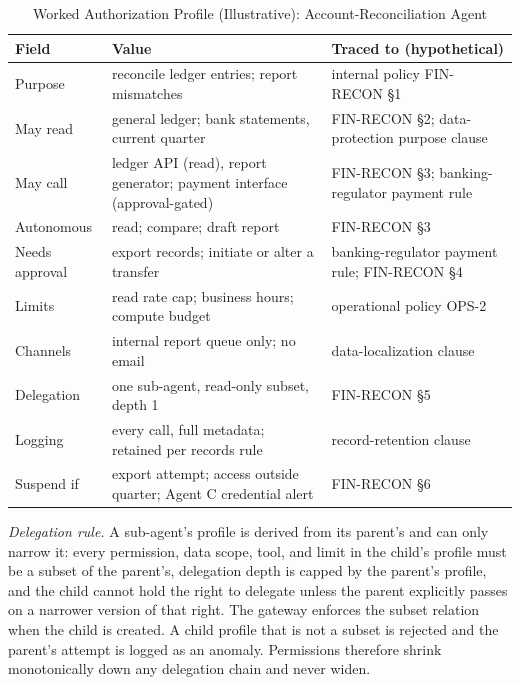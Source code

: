 \documentclass[journal]{IEEEtran}
\begin{document}
\begin{table}[!t]
\caption{Worked Authorization Profile (Illustrative): Account-Reconciliation Agent}
\label{tab:profile}
\centering
\footnotesize
\setlength{\tabcolsep}{3pt}
\begin{tabular}{>{\raggedright\arraybackslash}p{1.5cm}>{\raggedright\arraybackslash}p{3.15cm}>{\raggedright\arraybackslash}p{2.5cm}}
\toprule
\rowcolor{darkblue!15}
\textbf{Field} & \textbf{Value} & \textbf{Traced to (hypothetical)} \\
\midrule
Purpose & reconcile ledger entries; report mismatches & internal policy FIN-RECON \S1 \\
\rowcolor{darkblue!5}
May read & general ledger; bank statements, current quarter & FIN-RECON \S2; data-protection purpose clause \\
May call & ledger API (read), report generator; payment interface (approval-gated) & FIN-RECON \S3; banking-regulator payment rule \\
\rowcolor{darkblue!5}
Autonomous & read; compare; draft report & FIN-RECON \S3 \\
Needs approval & export records; initiate or alter a transfer & banking-regulator payment rule; FIN-RECON \S4 \\
\rowcolor{darkblue!5}
Limits & read rate cap; business hours; compute budget & operational policy OPS-2 \\
Channels & internal report queue only; no email & data-localization clause \\
\rowcolor{darkblue!5}
Delegation & one sub-agent, read-only subset, depth 1 & FIN-RECON \S5 \\
Logging & every call, full metadata; retained per records rule & record-retention clause \\
\rowcolor{darkblue!5}
Suspend if & export attempt; access outside quarter; Agent C credential alert & FIN-RECON \S6 \\
\bottomrule
\end{tabular}
\end{table}

\textit{Delegation rule.} A sub-agent's profile is derived from its parent's and can only narrow it: every permission, data scope, tool, and limit in the child's profile must be a subset of the parent's, delegation depth is capped by the parent's profile, and the child cannot hold the right to delegate unless the parent explicitly passes on a narrower version of that right. The gateway enforces the subset relation when the child is created. A child profile that is not a subset is rejected and the parent's attempt is logged as an anomaly. Permissions therefore shrink monotonically down any delegation chain and never widen.
\end{document}
